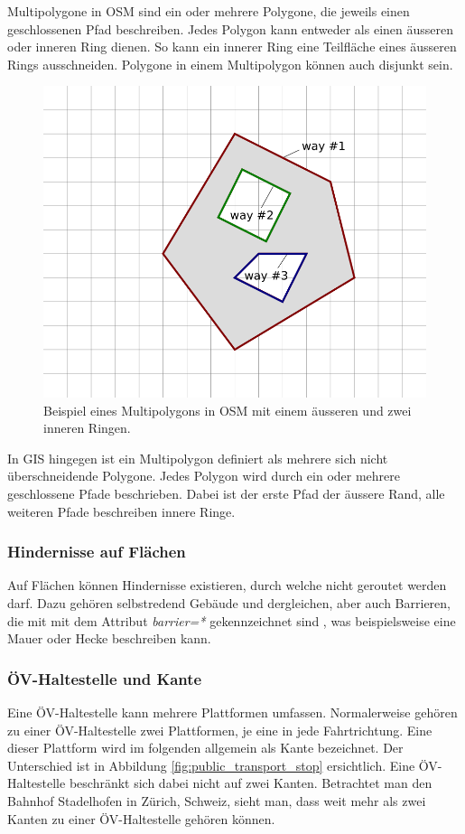 Multipolygone in \ac{OSM} sind ein oder mehrere Polygone, die jeweils einen geschlossenen Pfad beschreiben. Jedes Polygon kann entweder als einen äusseren oder inneren Ring dienen. So kann ein innerer Ring eine Teilfläche eines äusseren Rings ausschneiden. Polygone in einem Multipolygon können auch disjunkt sein. \cite{osm_wiki_multipolygon}

\begin{figure}[th]
\centering
\includegraphics[width=0.5\linewidth]{technicalreport/img/multipolygon_osm_example.png}
\caption[Multipolygon OSM Example]{Beispiel eines Multipolygons in \ac{OSM} mit einem äusseren und zwei inneren Ringen. \cite{osm_wiki_multipolygon}}
\label{fig:multipolygon_osm_example}
\end{figure}

In \ac{GIS} hingegen ist ein Multipolygon definiert als mehrere sich nicht überschneidende Polygone. Jedes Polygon wird durch ein oder mehrere geschlossene Pfade beschrieben. Dabei ist der erste Pfad der äussere Rand, alle weiteren Pfade beschreiben innere Ringe. \cite{opengis_simple_features}

\subsubsection{Hindernisse auf Flächen}
\label{Hindernisse in Flächen}

Auf Flächen können Hindernisse existieren, durch welche nicht geroutet werden darf. Dazu gehören selbstredend Gebäude und dergleichen, aber auch Barrieren, die mit  mit dem Attribut \textit{barrier=*} gekennzeichnet sind \cite{osm_wiki_barrier}, was beispielsweise eine Mauer oder Hecke beschreiben kann.

\subsubsection{ÖV-Haltestelle und Kante}
\label{ÖV-Haltestelle und Kante}
Eine ÖV-Haltestelle kann mehrere Plattformen umfassen. Normalerweise gehören zu einer ÖV-Haltestelle zwei Plattformen, je eine in jede Fahrtrichtung. Eine dieser Plattform wird im folgenden allgemein als Kante bezeichnet. Der Unterschied ist in Abbildung \ref{fig:public_transport_stop} ersichtlich. Eine ÖV-Haltestelle beschränkt sich dabei nicht auf zwei Kanten. Betrachtet man den Bahnhof Stadelhofen in Zürich, Schweiz, sieht man, dass weit mehr als zwei Kanten zu einer ÖV-Haltestelle gehören können.

